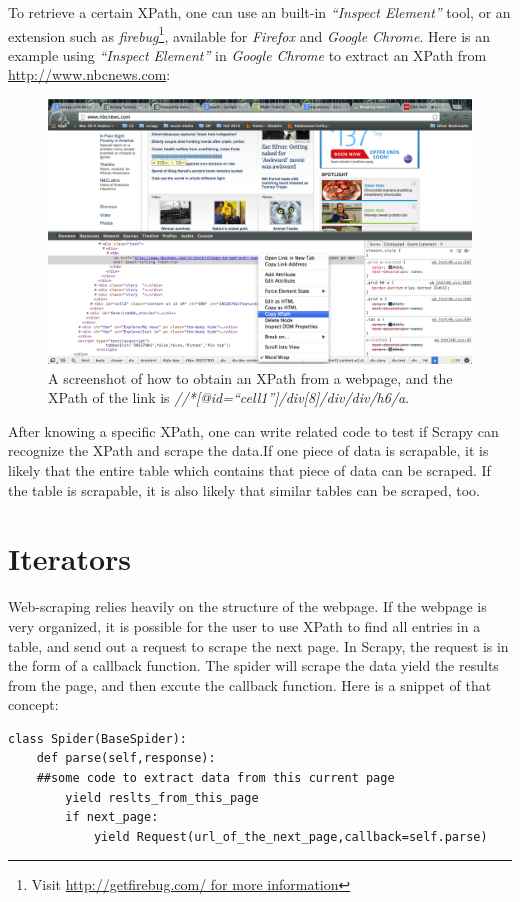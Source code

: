 \documentclass[12pt]{report}
\begin{document}
To retrieve a certain XPath, one can use an built-in \textit{``Inspect Element''} tool, or an extension such as \textit{firebug}\footnote{Visit \url{http://getfirebug.com/ for more information}}, available for \textit{Firefox} and \textit{Google Chrome}. Here is an example using \textit{``Inspect Element''} in \textit{Google Chrome} to extract an XPath from \url{http://www.nbcnews.com}:\\
\begin{figure}[htp]
\includegraphics[width=\textwidth]{XPath_example.png}
\caption[How to extract XPath]
{A screenshot of how to obtain an XPath from a webpage, and the XPath of the link is \textit{//*[@id=``cell1'']/div[8]/div/div/h6/a}.}
\end{figure}
After knowing a specific XPath, one can write related code to test if Scrapy can recognize the XPath and scrape the data.If one piece of data is scrapable, it is likely that the entire table which contains that piece of data can be scraped. If the table is scrapable, it is also likely that similar tables can be scraped, too.

\section{Iterators}

Web-scraping relies heavily on the structure of the webpage. If the webpage is very organized, it is possible for the user to use XPath to find all entries in a table, and send out a request to scrape the next page. In Scrapy, the request is in the form of a callback function. The spider will scrape the data yield the results from the page, and then excute the callback function. Here is a snippet of that concept:
\begin{lstlisting}
class Spider(BaseSpider):
	def parse(self,response):
	##some code to extract data from this current page
		yield reslts_from_this_page
		if next_page:
			yield Request(url_of_the_next_page,callback=self.parse)
\end{lstlisting}
\end{document}
